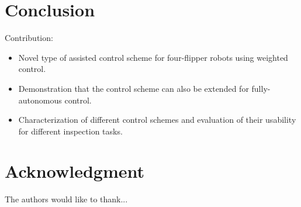 \documentclass[conference]{IEEEtran}
\begin{document}
\section{Conclusion}
Contribution:
\begin{itemize}
	\item Novel type of assisted control scheme for four-flipper robots using weighted control.
	\item Demonstration that the control scheme can also be extended for fully-autonomous control.
	\item Characterization of different control schemes and evaluation of their usability for different inspection tasks.
\end{itemize}

\section*{Acknowledgment}


The authors would like to thank...



\end{document}

